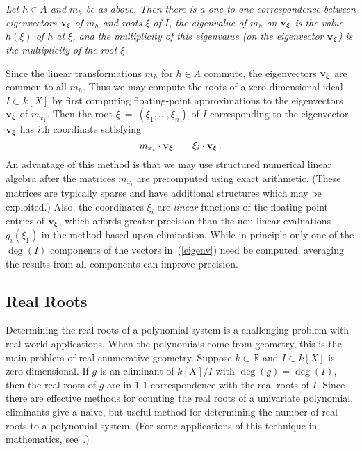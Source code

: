 {\it
Let $h\in A$ and $m_h$ be as above.
Then there is a one-to-one correspondence between eigenvectors
${\bf v}_\xi$ of $m_h$ and roots $\xi$ of $I$, the eigenvalue of $m_h$ on 
${\bf v}_\xi$ is the value $h(\xi)$ of $h$ at $\xi$, and the multiplicity
of this eigenvalue (on the eigenvector ${\bf v}_\xi$) is the
multiplicity of the root $\xi$.
}\medskip

Since the linear transformations $m_h$ for $h\in A$ commute, the
eigenvectors ${\bf v}_\xi$ are common to all $m_h$.
Thus we may compute the roots of a zero-dimensional ideal $I\subset k[X]$
by first computing floating-point approximations to the
eigenvectors ${\bf v}_\xi$ of $m_{x_1}$.
Then the root $\xi\ =\ (\xi_1,\ldots,\xi_n)$ of $I$ corresponding to the
eigenvector ${\bf v}_\xi$ has $i$th coordinate satisfying
%
\begin{equation}\label{eigenv}
   m_{x_i}\cdot {\bf v}_\xi\ =\ \xi_i \cdot {\bf v}_\xi\,.
\end{equation}
%
An advantage of this method is that we may use structured numerical linear
algebra after the matrices $m_{x_i}$ are precomputed using exact arithmetic. 
(These matrices are typically sparse and have additional structures which may
be exploited.)
Also, the coordinates $\xi_i$ are {\it linear} functions of the floating
point entries of ${\bf v}_\xi$, which affords greater precision than 
the non-linear evaluations $g_i(\xi_1)$ in the method based upon elimination.
While in principle only one of the $\deg(I)$ components of the vectors
in~(\ref{eigenv}) need be computed, averaging the results from all
components can improve precision.


\subsection{Real Roots}
Determining the real roots of a polynomial system is a challenging problem
with real world applications.
When the polynomials come from geometry, this is the main problem of
real enumerative geometry.
Suppose $k\subset{\mathbb R}$ and $I\subset k[X]$ is zero-dimensional.
If $g$ is an eliminant of $k[X]/I$ 
with $\deg(g)=\deg(I)$, then the real roots of
$g$ are in 1-1 correspondence with the real roots of $I$.
Since there are effective methods for counting the real roots of a univariate
polynomial, eliminants give a na\"\i ve, but useful method for determining the
number of real roots to a polynomial system.
(For some applications of this technique in mathematics,
see~\cite{SO:RS98,SO:So_shap-www,SO:So00b}.) 

